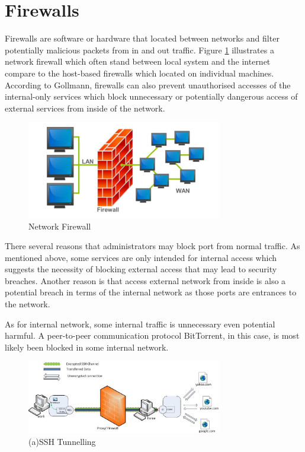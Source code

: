 \documentclass{article}
\begin{document}
\section{Firewalls}
\label{sec:firewalls}

Firewalls are software or hardware that located between networks and filter potentially malicious 
packets from in and out traffic\cite{AndersonRoss1956-2008Se:a}.
Figure \ref{firewall} illustrates a network firewall which often stand between local system and 
the internet compare to the host-based firewalls which located on individual machines. 
According to Gollmann, firewalls can also prevent unauthorised accesses of the internal-only services which 
block unnecessary or potentially dangerous access of external services from inside of the network\cite{GollmannDieter2011Cs/D}.

\begin{figure}[H]
  \includegraphics[width=8.5cm]{firewall}
  \caption{Network Firewall}
  \label{firewall}
\end{figure}

There several reasons that administrators may block port from normal traffic. As mentioned above, some services 
are only intended for internal access which suggests the necessity of blocking external access that 
may lead to security breaches. Another reason is that access external network from inside is also a potential 
breach in terms of the internal network as those ports are entrances to the network. 

As for internal network, some internal traffic is unnecessary even potential harmful. A peer-to-peer 
communication protocol BitTorrent, in this case, is most likely been blocked in some internal network.

\begin{figure}[H]
  \includegraphics[width=8.5cm]{ssh}
  \caption{(a)SSH Tunnelling\cite{chamith_2012}}
  \label{ssh}
\end{figure}
\end{document}
